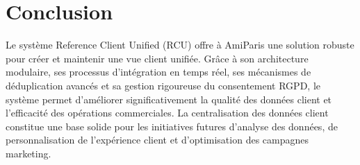 \section{Conclusion}

Le système Reference Client Unified (RCU) offre à AmiParis une solution robuste pour créer et maintenir une vue client unifiée. Grâce à son architecture modulaire, ses processus d'intégration en temps réel, ses mécanismes de déduplication avancés et sa gestion rigoureuse du consentement RGPD, le système permet d'améliorer significativement la qualité des données client et l'efficacité des opérations commerciales. La centralisation des données client constitue une base solide pour les initiatives futures d'analyse des données, de personnalisation de l'expérience client et d'optimisation des campagnes marketing. 